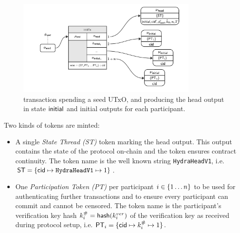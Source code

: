 \begin{figure}
	\centering
	\includegraphics[width=0.8\textwidth]{figures/initTx.pdf}
	\caption{\mtxInit{} transaction spending a seed UTxO, and producing the head
		output in state $\mathsf{initial}$ and initial outputs for each participant.}\label{fig:initTx}
\end{figure}

\noindent Two kinds of tokens are minted:
\begin{itemize}
	\item A single \emph{State Thread (ST)} token marking the head output. This
	      output contains the state of the protocol on-chain and the token ensures
	      contract continuity. The token name is the well known string
	      \texttt{HydraHeadV1}, i.e.
	      $\mathsf{ST} = \{\mathsf{cid} \mapsto \texttt{HydraHeadV1} \mapsto 1\}$.
	\item One \emph{Participation Token (PT)} per participant
	      $i \in \{1 \dots n \}$ to be used for authenticating further
	      transactions and to ensure every participant can commit and cannot be
	      censored. The token name is the participant's verification key hash
	      $k^{\#}_{i} = \mathsf{hash}(k^{ver}_{i})$ of the verification key as received
	      during protocol setup, i.e.
	      $\mathsf{PT}_{i} = \{\mathsf{cid} \mapsto k^{\#}_{i} \mapsto 1\}$.
\end{itemize}

